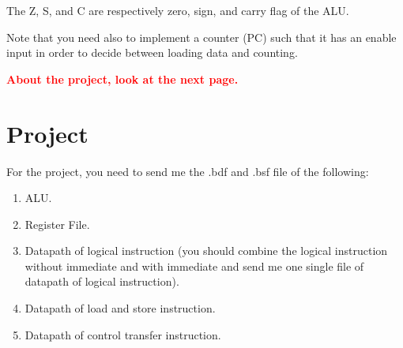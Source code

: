 \documentclass[11pt]{article}
\begin{document}
The Z, S, and C are respectively zero, sign, and carry flag of the ALU. 

\bigskip

Note that you need also to implement a counter (PC) such that it has an enable input in order to decide between loading data and counting.

\bigskip

\bigskip


\bigskip

\textbf{\textcolor{red}{About the project, look at the next page.}}

\newpage

\section*{Project}

For the project, you need to send me the .bdf and .bsf file of the following: 

\begin{enumerate}
    \item ALU.
    \item Register File.
    \item Datapath of logical instruction (you should combine the logical instruction without immediate and with immediate and send me one single file of datapath of logical instruction).
    \item Datapath of load and store instruction.
    \item Datapath of control transfer instruction. 
\end{enumerate}
\end{document}
